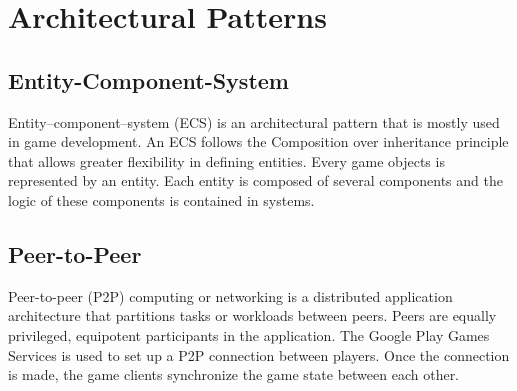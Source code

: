 \section{Architectural Patterns}

	\subsection{Entity-Component-System}
	Entity–component–system (ECS) is an architectural pattern that is mostly used in game development. An ECS follows the Composition over inheritance principle that allows greater flexibility in defining entities.  
	Every game objects is represented by an entity. Each entity is composed of several components and the logic of these components is contained in systems.
	
	\subsection{Peer-to-Peer}
	Peer-to-peer (P2P) computing or networking is a distributed application architecture that partitions tasks or workloads between peers. Peers are equally privileged, equipotent participants in the application.
	The Google Play Games Services is used to set up a P2P connection between players. Once the connection is made, the game clients synchronize the game state between each other.
	
	